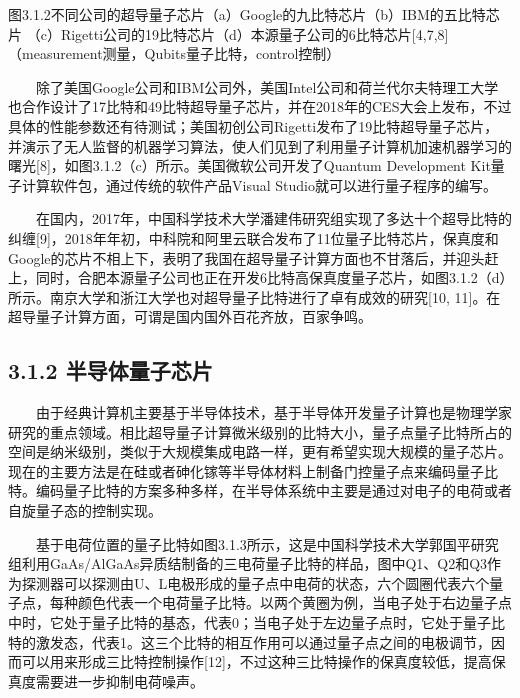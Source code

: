 \documentclass[a4paper,11pt,english]{sphinxmanual}
\begin{document}

\begin{center}图3.1.2不同公司的超导量子芯片（a）Google的九比特芯片（b）IBM的五比特芯片 （c）Rigetti公司的19比特芯片（d）本源量子公司的6比特芯片{[}4,7,8{]}（measurement\sphinxhyphen{}测量，Qubits\sphinxhyphen{}量子比特，control\sphinxhyphen{}控制）
\end{center}
\sphinxAtStartPar
  除了美国Google公司和IBM公司外，美国Intel公司和荷兰代尔夫特理工大学也合作设计了17比特和49比特超导量子芯片，并在2018年的CES大会上发布，不过具体的性能参数还有待测试；美国初创公司Rigetti发布了19比特超导量子芯片，并演示了无人监督的机器学习算法，使人们见到了利用量子计算机加速机器学习的曙光{[}8{]}，如图3.1.2（c）所示。美国微软公司开发了Quantum Development Kit量子计算软件包，通过传统的软件产品Visual Studio就可以进行量子程序的编写。

\sphinxAtStartPar
  在国内，2017年，中国科学技术大学潘建伟研究组实现了多达十个超导比特的纠缠{[}9{]}，2018年年初，中科院和阿里云联合发布了11位量子比特芯片，保真度和Google的芯片不相上下，表明了我国在超导量子计算方面也不甘落后，并迎头赶上，同时，合肥本源量子公司也正在开发6比特高保真度量子芯片，如图3.1.2（d）所示。南京大学和浙江大学也对超导量子比特进行了卓有成效的研究{[}10, 11{]}。在超导量子计算方面，可谓是国内国外百花齐放，百家争鸣。


\subsection{3.1.2 半导体量子芯片}
\label{\detokenize{rst/3.1_u91cf_u5b50_u82af_u7247:id3}}
\sphinxAtStartPar
  由于经典计算机主要基于半导体技术，基于半导体开发量子计算也是物理学家研究的重点领域。相比超导量子计算微米级别的比特大小，量子点量子比特所占的空间是纳米级别，类似于大规模集成电路一样，更有希望实现大规模的量子芯片。现在的主要方法是在硅或者砷化镓等半导体材料上制备门控量子点来编码量子比特。编码量子比特的方案多种多样，在半导体系统中主要是通过对电子的电荷或者自旋量子态的控制实现。

\sphinxAtStartPar
  基于电荷位置的量子比特如图3.1.3所示，这是中国科学技术大学郭国平研究组利用GaAs/AlGaAs异质结制备的三电荷量子比特的样品，图中Q1、Q2和Q3作为探测器可以探测由U、L电极形成的量子点中电荷的状态，六个圆圈代表六个量子点，每种颜色代表一个电荷量子比特。以两个黄圈为例，当电子处于右边量子点中时，它处于量子比特的基态，代表0；当电子处于左边量子点时，它处于量子比特的激发态，代表1。这三个比特的相互作用可以通过量子点之间的电极调节，因而可以用来形成三比特控制操作{[}12{]}，不过这种三比特操作的保真度较低，提高保真度需要进一步抑制电荷噪声。
\end{document}

